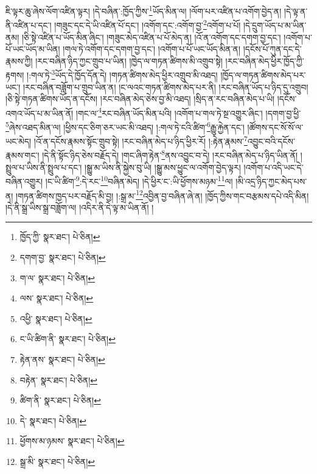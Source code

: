 ཇི་ལྟར་ཆུ་ཞེས་ལོག་འཛིན་ལྟར། །དེ་བཞིན་:ཁྱོད་ཀྱིས་\footnote{ཁྱོད་ཀྱི་  སྣར་ཐང་།  པེ་ཅིན། }ཡོད་མིན་ལ། །ལོག་པར་འཛིན་པ་འགོག་བྱེད་ན། །དེ་ལྟ་ན་ནི་འཛིན་པ་དང་། །གཟུང་དང་དེ་ཡི་འཛིན་པོ་དང་། །འགོག་དང་:འགོག་བྱ་\footnote{དགག་བྱ་  སྣར་ཐང་།  པེ་ཅིན། }འགོག་པ་པོ། །དེ་དྲུག་ཡོད་པ་མ་ཡིན་ནམ། །ཅི་སྟེ་འཛིན་པ་ཡོད་མིན་ཞིང་། །གཟུང་མེད་འཛིན་པ་པོ་མེད་ན། །འོ་ན་འགོག་དང་དགག་བྱ་དང་། །འགོག་པ་པོ་ཡང་ཡོད་མ་ཡིན། །གལ་ཏེ་འགོག་དང་དགག་བྱ་དང་། །འགོག་པ་པོ་ཡང་ཡོད་མིན་ན། །དངོས་པོ་ཀུན་དང་དེ་རྣམས་ཀྱི། །རང་བཞིན་ཉིད་ཀྱང་གྲུབ་པ་ཡིན། །ཁྱེད་ལ་གཏན་ཚིགས་མི་འགྲུབ་སྟེ། །རང་བཞིན་མེད་ཕྱིར་ཁྱོད་ཀྱི་རྟགས། །:གལ་ཏེ་\footnote{ག་ལ་  སྣར་ཐང་།  པེ་ཅིན། }ཡོད་དེ་ཁྱོད་དོན་དེ། །གཏན་ཚིགས་མེད་ཕྱིར་འགྲུབ་མི་འཐད། །ཁྱོད་ལ་གཏན་ཚིགས་མེད་པར་ཡང་། །རང་བཞིན་བཟློག་པ་གྲུབ་ཡིན་ན། །ང་ལའང་གཏན་ཚིགས་མེད་པར་ནི། །རང་བཞིན་ཡོད་པ་ཉིད་དུ་འགྲུབ། །ཅི་སྟེ་གཏན་ཚིགས་ཡོད་ན་དངོས། །རང་བཞིན་མེད་ཅེས་བྱ་མི་འཐད། །སྲིད་ན་རང་བཞིན་མེད་པ་ཡི། །དངོས་འགའ་ཡོད་པ་མ་ཡིན་ནོ། །གང་ལ་\footnote{ལས་  སྣར་ཐང་།  པེ་ཅིན། }རང་བཞིན་ཡོད་མིན་པའི། །འགོག་པ་གལ་ཏེ་སྔ་འགྱུར་ཞིང་། །དགག་བྱ་ཕྱི་\footnote{འཕྱི་  སྣར་ཐང་།  པེ་ཅིན། }ཞེས་འཐད་མིན་ལ། །ཕྱིས་དང་ཅིག་ཅར་ཡང་མི་འཐད། །:གལ་ཏེ་ངའི་ཚིག་\footnote{ང་ཡི་ཚིག་ནི་  སྣར་ཐང་།  པེ་ཅིན། }རྒྱུ་རྐྱེན་དང་། །ཚོགས་དང་སོ་སོ་ལ་ཡང་མེད། །འོ་ན་དངོས་རྣམས་སྟོང་གྲུབ་སྟེ། །རང་བཞིན་མེད་པ་ཉིད་ཕྱིར་རོ། །:རྟེན་རྣམས་\footnote{རྟེན་ནས་  སྣར་ཐང་།  པེ་ཅིན། }འབྱུང་བའི་དངོས་རྣམས་གང་། །དེ་ནི་སྟོང་ཉིད་ཅེས་བརྗོད་དེ། །གང་ཞིག་རྟེན་\footnote{བརྟེན་  སྣར་ཐང་།  པེ་ཅིན། }ནས་འབྱུང་བ་དེ། །རང་བཞིན་མེད་པ་ཉིད་ཡིན་ནོ། །སྤྲུལ་པ་ཡིས་ནི་སྤྲུལ་པ་དང་། །སྒྱུ་མ་ཡིས་ནི་སྐྱེས་བུ་ཡི། །སྒྱུ་མས་ཕྱུང་ལ་འགོག་བྱེད་ལྟར། །འགོག་པ་འདི་ཡང་དེ་བཞིན་འགྱུར། །ང་ཡི་ཚིག་\footnote{ཚིག་ནི་  སྣར་ཐང་།  པེ་ཅིན། }:དེ་རང་\footnote{དེ་  སྣར་ཐང་།  པེ་ཅིན། }བཞིན་མེད། །དེ་ཕྱིར་ང་:ཡི་ཕྱོགས་མཉམ་\footnote{ཕྱོགས་མ་ཉམས་  སྣར་ཐང་།  པེ་ཅིན། }ལ། །མི་འདྲ་ཉིད་ཀྱང་མེད་པས་ན། །གཏན་ཚིགས་ཁྱད་པར་བརྗོད་མི་བྱ། །:སྒྲ་མ་\footnote{སྒྲ་མི་  སྣར་ཐང་།  པེ་ཅིན། }འབྱིན་བྱ་བཞིན་ཞེ་ན། །ཁྱོད་ཀྱིས་གང་བརྩམས་དཔེ་འདི་མིན། །དེ་ནི་སྒྲ་ཡིས་སྒྲ་བཟློག་ལ། །འདིར་ནི་དེ་ལྟ་མ་ཡིན་ནོ། །
